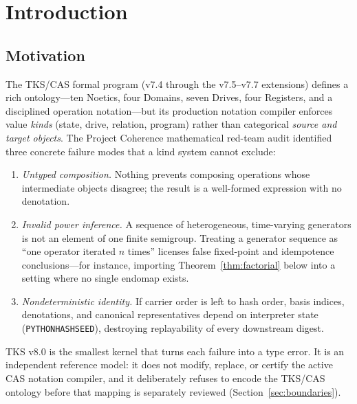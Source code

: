 \documentclass[11pt]{amsart}
\theoremstyle{definition}
\theoremstyle{remark}
\begin{document}
\maketitle
\tableofcontents

\section{Introduction}\label{sec:intro}

\subsection{Motivation}
The TKS/CAS formal program (v7.4 through the v7.5--v7.7 extensions) defines a rich ontology---ten Noetics, four Domains, seven Drives, four Registers, and a disciplined operation notation---but its production notation compiler enforces value \emph{kinds} (state, drive, relation, program) rather than categorical \emph{source and target objects}. The Project Coherence mathematical red-team audit identified three concrete failure modes that a kind system cannot exclude:

\begin{enumerate}
\item \emph{Untyped composition.} Nothing prevents composing operations whose intermediate objects disagree; the result is a well-formed expression with no denotation.
\item \emph{Invalid power inference.} A sequence of heterogeneous, time-varying generators is not an element of one finite semigroup. Treating a generator sequence as ``one operator iterated $n$ times'' licenses false fixed-point and idempotence conclusions---for instance, importing Theorem~\ref{thm:factorial} below into a setting where no single endomap exists.
\item \emph{Nondeterministic identity.} If carrier order is left to hash order, basis indices, denotations, and canonical representatives depend on interpreter state (\texttt{PYTHONHASHSEED}), destroying replayability of every downstream digest.
\end{enumerate}

TKS v8.0 is the smallest kernel that turns each failure into a type error. It is an independent reference model: it does not modify, replace, or certify the active CAS notation compiler, and it deliberately refuses to encode the TKS/CAS ontology before that mapping is separately reviewed (Section~\ref{sec:boundaries}).
\end{document}
